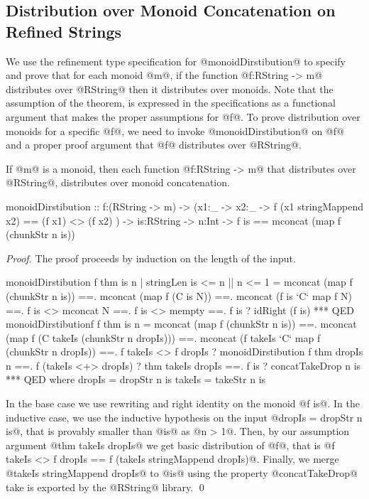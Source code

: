 \subsection{Distribution over Monoid Concatenation on Refined Strings}\label{subsec:distribution}
%
We use the refinement type specification for @monoidDirstibution@
to specify and prove  that for each monoid @m@, 
if the function @f:RString -> m@ distributes over @RString@
then it distributes over monoids. 
%
Note that the assumption of the theorem, 
is expressed in the specifications as a functional argument 
that makes the proper assumptions for @f@. 
%
To prove distribution over monoids for a specific @f@, 
we need to invoke @monoidDirstibution@ 
on @f@ and a proper proof argument that @f@ distributes over @RString@.
%
\begin{theorem}\label{theorem:monoid:distribution}
If @m@ is a monoid, then each function @f:RString -> m@
that distributes over @RString@, distributes over monoid concatenation.
%
\begin{code}
monoidDirstibution
  :: f:(RString -> m)
  -> (x1:_ -> x2:_ -> {f (x1 stringMappend x2) == (f x1) <> (f x2)} )
  -> is:RString
  -> n:Int 
  -> {f is == mconcat (map f (chunkStr n is))}
\end{code}
\end{theorem}

\begin{proof}
The proof proceeds by induction on the length of the input.
%
\begin{code}
monoidDirstibution f thm is n  
  | stringLen is <= n || n <= 1
  =   mconcat (map f (chunkStr n is))
  ==. mconcat (map f (C is N))
  ==. mconcat (f is `C` map f N)
  ==. f is <> mconcat N
  ==. f is <> mempty 
  ==. f is ? idRight (f is)
  *** QED 
monoidDirstibutionf f thm is n  
  =   mconcat (map f (chunkStr n is))
  ==. mconcat (map f (C takeIs (chunkStr n dropIs))) 
  ==. mconcat (f takeIs `C` map f (chunkStr n dropIs))
  ==. f takeIs <> f dropIs
       ? monoidDirstibution f thm dropIs n  
  ==. f (takeIs <+> dropIs)
       ? thm takeIs dropIs
  ==. f is 
       ? concatTakeDrop n is 
  *** QED  
  where
    dropIs = dropStr n is 
    takeIs = takeStr n is 
\end{code}
%
In the base case we use rewriting and right identity on the monoid @f is@. 
%
In the inductive case, 
we use the inductive hypothesis on the input @dropIs = dropStr n is@, 
that is provably smaller than @is@ as @n > 1@. 
%
Then, by our assumption argument @thm takeIs dropIs@
we get basic distribution of @f@, that is 
@f takeIs <> f dropIs == f (takeIs stringMappend dropIs)@. 
%
Finally, we merge @takeIs stringMappend dropIs@ to @is@
using the property @concatTakeDrop@ take is exported by the @RString@
library.
\qed\end{proof}